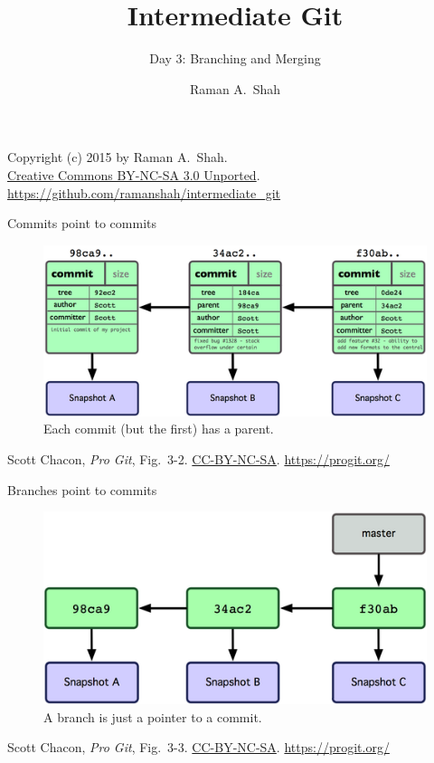 

\title{Intermediate Git}
\subtitle{Day 3: Branching and Merging}
\author{Raman A.~Shah}
\date{}



\begin{frame}[plain]
  \titlepage
  \footnotesize{Copyright (c) 2015 by Raman A.~Shah.\\
  \href{https://creativecommons.org/licenses/by-nc-sa/3.0/legalcode}
       {Creative Commons BY-NC-SA 3.0 Unported}.\\
   \href{https://github.com/ramanshah/intermediate\_git}
        {https://github.com/ramanshah/intermediate\_git}}
\end{frame}

\begin{frame}{Commits point to commits}
  \begin{figure}
    \includegraphics[scale=0.8]{18333fig0302-tn.png}
    \\ Each commit (but the first) has a parent.
  \end{figure}
  \footnotesize{Scott Chacon,
    \emph{Pro Git},
    Fig.~3-2.
    \href{https://creativecommons.org/licenses/by-nc-sa/3.0/legalcode}{CC-BY-NC-SA}.
    \href{https://progit.org/}{https://progit.org/}}
\end{frame}

\begin{frame}{Branches point to commits}
  \begin{figure}
    \includegraphics[scale=0.8]{18333fig0303-tn.png}
    \\ A branch is just a pointer to a commit.
  \end{figure}
  \footnotesize{Scott Chacon,
    \emph{Pro Git},
    Fig.~3-3.
    \href{https://creativecommons.org/licenses/by-nc-sa/3.0/legalcode}{CC-BY-NC-SA}.
    \href{https://progit.org/}{https://progit.org/}}
\end{frame}

